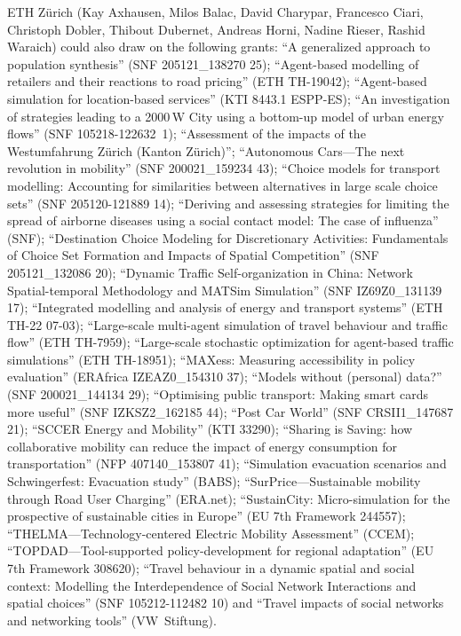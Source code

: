 ETH Zürich (Kay Axhausen, Milos Balac, David Charypar, Francesco Ciari, Christoph Dobler, Thibout Dubernet, Andreas Horni, Nadine Rieser, Rashid Waraich) could also draw on the following grants: 
%
``A generalized approach to population synthesis'' (SNF 205121\_138270 25); 
``Agent-based modelling of retailers and their reactions to road pricing'' (ETH TH-19042); 
``Agent-based simulation for location-based services'' (KTI 8443.1 ESPP-ES); 
``An investigation of strategies leading to a 2000\,W City using a bottom-up model of urban energy flows'' (SNF 105218-122632~1); 
``Assessment of the impacts of the Westumfahrung Zürich (Kanton Zürich)''; 
``Autonomous Cars---The next revolution in mobility'' (SNF 200021\_159234 43); 
``Choice models for transport modelling: Accounting for similarities between alternatives in large scale choice sets'' (SNF 205120-121889 14); 
``Deriving and assessing strategies for limiting the spread of airborne diseases using a social contact model: The case of influenza'' (SNF); 
``Destination Choice Modeling for Discretionary Activities: Fundamentals of Choice Set Formation and Impacts of Spatial Competition'' (SNF 205121\_132086 20); 
``Dynamic Traffic Self-organization in China: Network Spatial-temporal Methodology and MATSim Simulation'' (SNF IZ69Z0\_131139 17); 
``Integrated modelling and analysis of energy and transport systems'' (ETH TH-22 07-03); 
``Large-scale multi-agent simulation of travel behaviour and traffic flow'' (ETH TH-7959); 
``Large-scale stochastic optimization for agent-based traffic simulations'' (ETH TH-18951); 
``MAXess: Measuring accessibility in policy evaluation'' (ERAfrica IZEAZ0\_154310 37); 
``Models without (personal) data?'' (SNF 200021\_144134 29); 
``Optimising public transport: Making smart cards more useful'' (SNF IZKSZ2\_162185 44); 
``Post Car World'' (SNF CRSII1\_147687 21); 
``SCCER Energy and Mobility'' (KTI 33290); 
``Sharing is Saving: how collaborative mobility can reduce the impact of energy consumption for transportation'' (NFP 407140\_153807 41); 
``Simulation evacuation scenarios and Schwingerfest: Evacuation study'' (BABS); 
``SurPrice---Sustainable mobility through Road User Charging'' (ERA.net); 
``SustainCity: Micro-simulation for the prospective of sustainable cities in Europe'' (EU 7th Framework 244557); 
``THELMA---Technology-centered Electric Mobility Assessment'' (CCEM); 
``TOPDAD---Tool-supported policy-development for regional adaptation'' (EU 7th Framework 308620);
``Travel behaviour in a dynamic spatial and social context: Modelling the Interdependence of Social Network Interactions and spatial choices'' (SNF 105212-112482 10) and 
``Travel impacts of social networks and networking tools'' (VW~Stiftung).

